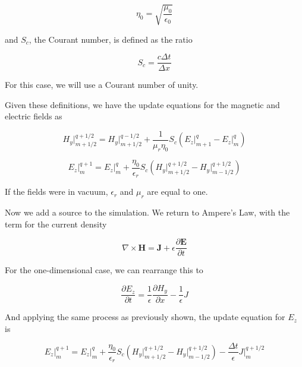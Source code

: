 \documentclass{article}
\begin{document}
\begin{equation}
\eta_0 = \sqrt{\dfrac{\mu_0}{\epsilon_0}}
\end{equation}

and \(S_c\), the Courant number, is defined as the ratio

\begin{equation}
S_c = \dfrac{c \Delta t}{\Delta x}
\end{equation}

For this case, we will use a Courant number of unity.

    Given these definitions, we have the update equations for the magnetic
and electric fields as

\begin{equation}
H_y \Big |^{q+1/2}_{m+1/2} = H_y \Big |^{q-1/2}_{m+1/2} + \dfrac{1}{\mu_r \eta_0} S_c \left ( E_z \Big |^{q}_{m+1} - E_z \Big |^{q}_{m} \right )
\end{equation}

\begin{equation}
E_z \Big |^{q+1}_{m} = E_z \Big |^{q}_{m} + \dfrac{\eta_0}{\epsilon_r} S_c \left ( H_y \Big |^{q+1/2}_{m+1/2} - H_y \Big |^{q+1/2}_{m-1/2} \right )
\end{equation}

If the fields were in vacuum, \(\epsilon_r\) and \(\mu_r\) are equal to
one.

    Now we add a source to the simulation. We return to Ampere's Law, with
the term for the current density

\begin{equation}
\nabla \times \mathbf H = \mathbf J + \epsilon \dfrac{ \partial \mathbf E}{\partial t}
\end{equation}

For the one-dimensional case, we can rearrange this to

\begin{equation}
\dfrac{\partial E_z}{\partial t} = \dfrac{1}{\epsilon} \dfrac{\partial H_y}{\partial x} - \dfrac{1}{\epsilon} J
\end{equation}

And applying the same process as previously shown, the update equation
for \(E_z\) is

\begin{equation}
E_z \Big |^{q+1}_{m} = E_z \Big |^{q}_{m} + \dfrac{\eta_0}{\epsilon_r} S_c \left ( H_y \Big |^{q+1/2}_{m+1/2} - H_y \Big |^{q+1/2}_{m-1/2} \right ) - \dfrac{\Delta t}{\epsilon} J \Big |^{q+1/2}_{m}
\end{equation}
\end{document}

